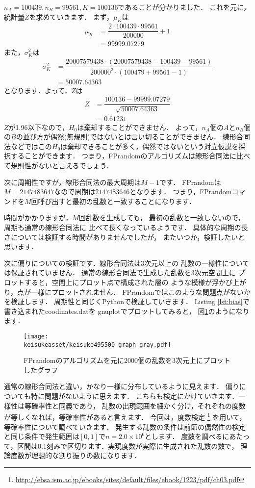 $n_A = 100439, n_B = 99561, K = 100136$であることが分かりました．
これを元に，統計量$Z$を求めていきます．
まず，$\mu_K$は
\begin{align*}
\mu_K &= \dfrac{2\cdot 100439\cdot 99561}{200000} + 1 \\
&= 99999.07279
\end{align*}
また，$\sigma_K^2$は
\begin{align*}
  \sigma_K^2 &= \dfrac{20007579438\cdot
  (20007579438 - 100439 - 99561)}
  {200000^2\cdot(100479 + 99561 - 1)} \\
  &= 50007.64363
\end{align*}
となります．よって，$Z$は
\begin{align*}
Z &= \dfrac{100136 - 99999.07279}{\sqrt{50007.64363}} \\
&= 0.61231
\end{align*}
$Z$が1.96以下なので，$H_0$は棄却することができません．
よって，$n_A$個の$A$と$n_B$個の$B$の並び方が偶然(無規則)ではないとは言い切ることができません．
線形合同法などではこの$H_0$は棄却できることが多く，偶然ではないという対立仮説を採択することができます．
つまり，FPrandomのアルゴリズムは線形合同法に比べて規則性がないと言えるでしょう．

次に周期性ですが，線形合同法の最大周期は$M-1$です．
FPrandomは$M=2147483647$なので周期は$2147483646$となります．
つまり，FPrandomコマンドを$M$回呼び出すと最初の乱数と一致することになります．

{
}
時間がかかりますが，$M$回乱数を生成しても，
最初の乱数と一致しないので，周期も通常の線形合同法に
比べて長くなっているようです．
具体的な周期の長さについては検証する時間がありませんでしたが，
またいつか，検証したいと思います．

次に偏りについての検証です．線形合同法は3次元以上の
乱数の一様性については保証されていません．
通常の線形合同法で生成した乱数を3次元空間上に
プロットすると，空間上にプロット点で構成された層の
ような模様が浮かび上がり，点が一様にプロットされません．
FPrandomではこのような問題点がないかを検証します．
周期性と同じくPythonで検証していきます．
{
\label{lst:bias}
}
Listing \ref{lst:bias}で書き込まれたcoodinates.datを
gnuplotでプロットしてみると，
図\ref{fig:bias}のようになります．
\begin{figure}[htbp]
  \centering
  \texttt{[image: \\keisukeasset/keisuke495500\_graph\_gray.pdf]}
  \caption{FPrandomのアルゴリズムを元に2000個の乱数を3次元上にプロットしたグラフ}
  \label{fig:bias}
\end{figure}
通常の線形合同法と違い，かなり一様に分布しているように見えます．
偏りについても特に問題がないように思えます．
こちらも検定にかけていきます．一様性は等確率性と同義であり，
乱数の出現範囲を細かく分け，それぞれの度数が等しくなれば，等確率性があると言えます．
今回は，度数検定
\footnote{\url{http://ebsa.ism.ac.jp/ebooks/sites/default/files/ebook/1223/pdf/ch03.pdf}}
を用いて，等確率性について調べていきます．
発生する乱数の条件は前節の偶然性の検定と同じ条件で発生範囲は$[0,1]$で$n = 2.0 \times 10^6$とします．
度数を調べるにあたって，区間は0.1刻みで区切ります．実現度数が実際に生成された乱数の数で，
理論度数が理想的な割り振りの数になります．

